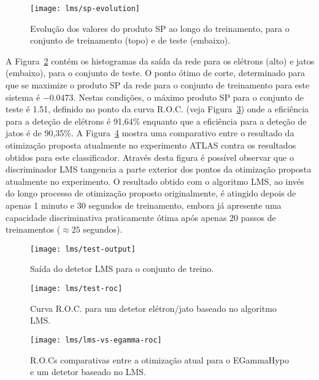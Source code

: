 \begin{figure}
\begin{center}
\texttt{[image: lms/sp-evolution]}
\end{center}
\caption{Evolução dos valores do produto SP ao longo do treinamento, para o
conjunto de treinamento (topo) e de teste (embaixo).}
\label{fig:lms-sp-evo}
\end{figure}

A Figura~\ref{fig:lms-test-output} contém os histogramas da saída da rede para
os elétrons (alto) e jatos (embaixo), para o conjunto de teste. O ponto ótimo
de corte, determinado para que se maximize o produto SP da rede para o
conjunto de treinamento para este sistema é $-0.0473$. Nestas condições, o
máximo produto SP para o conjunto de teste é 1.51, definido no ponto da curva
R.O.C. (veja Figura~\ref{fig:lms-test-roc}) onde a eficiência para a deteção
de elétrons é 91,64\% enquanto que a eficiência para a deteção de jatos é de
90,35\%. A Figura~\ref{fig:lms-vs-egamma-roc} mostra uma comparativo entre o
resultado da otimização proposta atualmente no experimento ATLAS contra os
resultados obtidos para este classificador. Através desta figura é possível
observar que o discriminador LMS tangencia a parte exterior dos pontos da
otimização proposta atualmente no experimento. O resultado obtido com o
algoritmo LMS, ao invés do longo processo de otimização proposto
originalmente, é atingido depois de apenas 1 minuto e 30 segundos de
treinamento, embora já apresente uma capacidade discriminativa praticamente
ótima após apenas 20 passos de treinamentos ($\approx 25$ segundos).

\begin{figure}
\begin{center}
\texttt{[image: lms/test-output]}
\end{center}
\caption{Saída do detetor LMS para o conjunto de treino.}
\label{fig:lms-test-output}
\end{figure}

\begin{figure}
\begin{center}
\texttt{[image: lms/test-roc]}
\end{center}
\caption{Curva R.O.C. para um detetor elétron/jato baseado no algoritmo LMS.}
\label{fig:lms-test-roc}
\end{figure}

\begin{figure}
\begin{center}
\texttt{[image: lms/lms-vs-egamma-roc]}
\end{center}
\caption{R.O.Cs comparativas entre a otimização atual para o EGammaHypo e um
detetor baseado no LMS.}
\label{fig:lms-vs-egamma-roc}
\end{figure}

